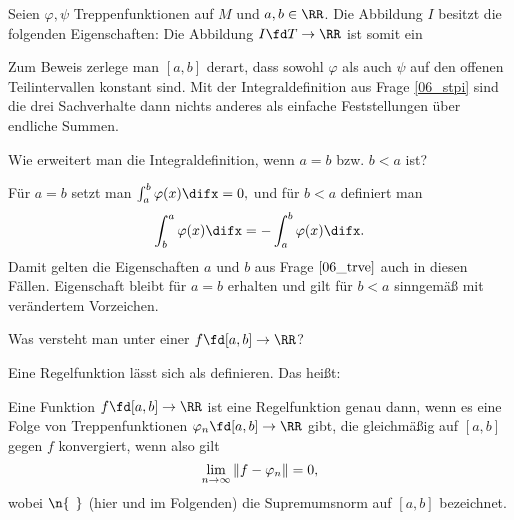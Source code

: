 \begin{antwort}
Seien $\varphi,\psi$ Treppenfunktionen auf $M$ und $a,b\in \RR$. 
Die Abbildung $I$ besitzt die folgenden Eigenschaften: \satz{
\[
\begin{array}{rp{2mm}lp{15mm}r}
\text{\desc{a}} & &
I(a\varphi+b\psi)= a \cdot I( \varphi)+b\cdot I(\psi),  & &
\text{(Linearität)} \\[1mm]
\text{\desc{c}} & &
\varphi \le \psi \Ra I(\varphi) \le I( \psi ). & &
\text{(Montonie)}\\[1mm]
\text{\desc{b}} & &
\left| I(\varphi) \right| \le I( |\varphi| ) \le (b-a)\cdot \| \varphi \|, & &
\text{(Beschränktheit)} 
\end{array}
\]}
Die Abbildung $I\fd T\to \RR$ ist somit ein 

Zum Beweis zerlege man $[a,b]$ derart, dass sowohl $\varphi$ 
als auch $\psi$ auf den offenen Teilintervallen konstant sind. 
Mit der Integraldefinition aus Frage \ref{06_stpi} sind die drei 
Sachverhalte dann nichts anderes als einfache Feststellungen über 
endliche Summen.
\AntEnd
\end{antwort}



\begin{frage}
Wie erweitert man die Integraldefinition, wenn $a=b$ bzw. $b<a$ ist?
\end{frage}

\begin{antwort}
Für $a=b$ setzt man $\int_a^b \varphi(x)\difx =0,$ und für 
$b<a$ definiert man 
\[
\int_b^a \varphi(x)\difx = - \int_a^b \varphi(x)\difx.
\] 
Damit gelten die Eigenschaften $a$ und $b$ aus Frage $\ref{06_trve}$ auch in 
diesen Fällen. Eigenschaft  bleibt für $a=b$ erhalten 
und gilt für $b<a$ sinngemäß mit verändertem Vorzeichen. 
\AntEnd

\smallskip
\end{antwort}

\smallskip
\begin{frage}
Was versteht man unter einer  $f\fd [a,b]\to\RR$?
\end{frage}

\begin{antwort}
Eine Regelfunktion lässt sich als 
 definieren. 
Das heißt:

\medskip
\noindent
Eine Funktion 
$f\fd [a,b]\to\RR$ ist eine Regelfunktion genau dann, wenn 
es eine Folge von Treppenfunktionen $\varphi_n \fd [a,b]\to\RR$ 
gibt, die gleichmäßig auf $[a,b]$ gegen $f$ konvergiert, wenn 
also gilt
\begin{equation}
\lim_{n\to\infty}\| f-\varphi_n \| = 0, \notag
\end{equation}
wobei $\n{\;\,}$ (hier und im Folgenden) 
die Supremumsnorm auf $[a,b]$ bezeichnet.
\AntEnd

\smallskip
\end{antwort}

